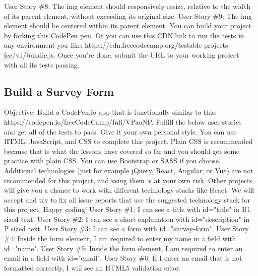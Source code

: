 \documentclass{article}%
\begin{document}
User Story \#8: The img element should responsively resize, relative to the width of its parent element, without exceeding its original size.\newline%
User Story \#9: The img element should be centered within its parent element.\newline%
You can build your project by forking this CodePen pen. Or you can use this CDN link to run the tests in any environment you like: https://cdn.freecodecamp.org/testable{-}projects{-}fcc/v1/bundle.js.\newline%
Once you're done, submit the URL to your working project with all its tests passing.\newline%

%
\subsection{Build a Survey Form}%
\label{subsec:BuildaSurveyForm}%
Objective: Build a CodePen.io app that is functionally similar to this: https://codepen.io/freeCodeCamp/full/VPaoNP.\newline%
Fulfill the below user stories and get all of the tests to pass. Give it your own personal style.\newline%
You can use HTML, JavaScript, and CSS to complete this project. Plain CSS is recommended because that is what the lessons have covered so far and you should get some practice with plain CSS. You can use Bootstrap or SASS if you choose. Additional technologies (just for example jQuery, React, Angular, or Vue) are not recommended for this project, and using them is at your own risk. Other projects will give you a chance to work with different technology stacks like React. We will accept and try to fix all issue reports that use the suggested technology stack for this project. Happy coding!\newline%
User Story \#1: I can see a title with id="title" in H1 sized text.\newline%
User Story \#2: I can see a short explanation with id="description" in P sized text.\newline%
User Story \#3: I can see a form with id="survey{-}form".\newline%
User Story \#4: Inside the form element, I am required to enter my name in a field with id="name".\newline%
User Story \#5: Inside the form element, I am required to enter an email in a field with id="email".\newline%
User Story \#6: If I enter an email that is not formatted correctly, I will see an HTML5 validation error.\newline%
\end{document}
